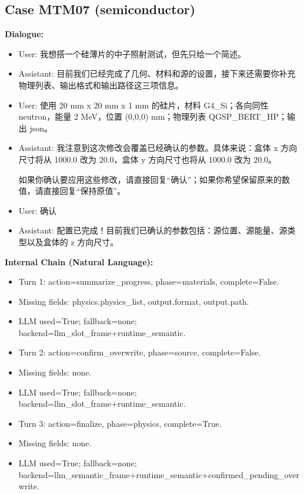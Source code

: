 \documentclass[11pt]{ctexart}
\begin{document}
\subsection{Case MTM07 (semiconductor)}
\textbf{Dialogue:}
\begin{itemize}
\item User: 我想搭一个硅薄片的中子照射测试，但先只给一个简述。
\item Assistant: 目前我们已经完成了几何、材料和源的设置，接下来还需要你补充物理列表、输出格式和输出路径这三项信息。
\item User: 使用 20 mm x 20 mm x 1 mm 的硅片，材料 G4\_Si；各向同性 neutron，能量 2 MeV，位置 (0,0,0) mm；物理列表 QGSP\_BERT\_HP；输出 json。
\item Assistant: 我注意到这次修改会覆盖已经确认的参数。具体来说：盒体 x 方向尺寸将从 1000.0 改为 20.0，盒体 y 方向尺寸也将从 1000.0 改为 20.0。

如果你确认要应用这些修改，请直接回复“确认”；如果你希望保留原来的数值，请直接回复“保持原值”。
\item User: 确认
\item Assistant: 配置已完成！目前我们已确认的参数包括：源位置、源能量、源类型以及盒体的 z 方向尺寸。
\end{itemize}
\textbf{Internal Chain (Natural Language):}
\begin{itemize}
\item Turn 1: action=summarize\_progress, phase=materials, complete=False.
\item Missing fields: physics.physics\_list, output.format, output.path.
\item LLM used=True; fallback=none; backend=llm\_slot\_frame+runtime\_semantic.
\item Turn 2: action=confirm\_overwrite, phase=source, complete=False.
\item Missing fields: none.
\item LLM used=True; fallback=none; backend=llm\_slot\_frame+runtime\_semantic.
\item Turn 3: action=finalize, phase=physics, complete=True.
\item Missing fields: none.
\item LLM used=True; fallback=none; backend=llm\_semantic\_frame+runtime\_semantic+confirmed\_pending\_overwrite.
\end{itemize}
\end{document}
